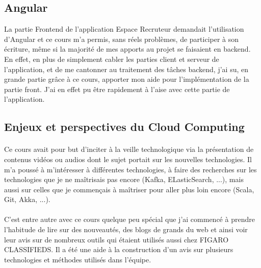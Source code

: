 \subsection{Angular}
\label{sub:Angular}
La partie Frontend de l'application Espace Recruteur demandait l'utilisation d'Angular et ce cours m'a permis, sans réels problèmes, de participer à son écriture, même si la majorité de mes apports au projet se faisaient en backend.
En effet, en plus de simplement cabler les parties client et serveur de l'application, et de me cantonner au traitement des tâches backend, j'ai su, en grande partie grâce à ce cours, apporter mon aide pour l'implémentation de la partie front.
J'ai en effet pu être rapidement à l'aise avec cette partie de l'application.

\subsection{Enjeux et perspectives du Cloud Computing}
\label{sub:Enjeux et perspectives du Cloud Computing}
\paragraph{}
Ce cours avait pour but d'inciter à la veille technologique via la présentation de contenus vidéos ou audios dont le sujet portait sur les nouvelles technologies.
Il m'a poussé à m'intéresser à différentes technologies, à faire des recherches sur les technologies que je ne maîtrisais pas encore (Kafka, ELasticSearch, ...), mais aussi sur celles que je commençais à maîtriser pour aller plus loin encore (Scala, Git, Akka, ...).
\paragraph{}
C'est entre autre avec ce cours quelque peu spécial que j'ai commencé à prendre l'habitude de lire sur des nouveautés, des blogs de grands du web et ainsi voir leur avis sur de nombreux outils qui étaient utilisés aussi chez FIGARO CLASSIFIEDS.
Il a été une aide à la construction d'un avis sur plusieurs technologies et méthodes utilisés dans l'équipe.
